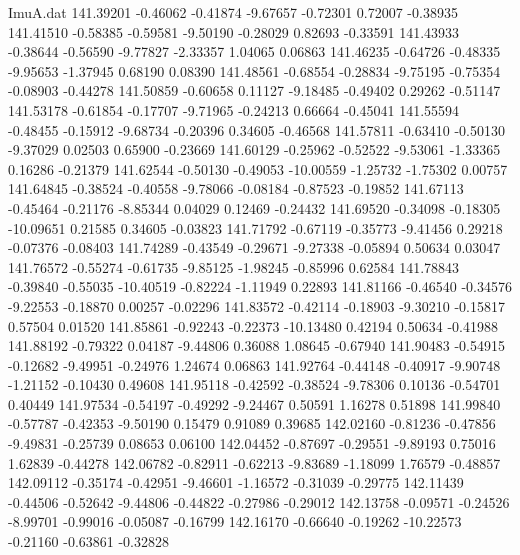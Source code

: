 \begin{filecontents}{ImuA.dat}
 141.39201   -0.46062   -0.41874   -9.67657   -0.72301    0.72007   -0.38935
 141.41510   -0.58385   -0.59581   -9.50190   -0.28029    0.82693   -0.33591
 141.43933   -0.38644   -0.56590   -9.77827   -2.33357    1.04065    0.06863
 141.46235   -0.64726   -0.48335   -9.95653   -1.37945    0.68190    0.08390
 141.48561   -0.68554   -0.28834   -9.75195   -0.75354   -0.08903   -0.44278
 141.50859   -0.60658    0.11127   -9.18485   -0.49402    0.29262   -0.51147
 141.53178   -0.61854   -0.17707   -9.71965   -0.24213    0.66664   -0.45041
 141.55594   -0.48455   -0.15912   -9.68734   -0.20396    0.34605   -0.46568
 141.57811   -0.63410   -0.50130   -9.37029    0.02503    0.65900   -0.23669
 141.60129   -0.25962   -0.52522   -9.53061   -1.33365    0.16286   -0.21379
 141.62544   -0.50130   -0.49053  -10.00559   -1.25732   -1.75302    0.00757
 141.64845   -0.38524   -0.40558   -9.78066   -0.08184   -0.87523   -0.19852
 141.67113   -0.45464   -0.21176   -8.85344    0.04029    0.12469   -0.24432
 141.69520   -0.34098   -0.18305  -10.09651    0.21585    0.34605   -0.03823
 141.71792   -0.67119   -0.35773   -9.41456    0.29218   -0.07376   -0.08403
 141.74289   -0.43549   -0.29671   -9.27338   -0.05894    0.50634    0.03047
 141.76572   -0.55274   -0.61735   -9.85125   -1.98245   -0.85996    0.62584
 141.78843   -0.39840   -0.55035  -10.40519   -0.82224   -1.11949    0.22893
 141.81166   -0.46540   -0.34576   -9.22553   -0.18870    0.00257   -0.02296
 141.83572   -0.42114   -0.18903   -9.30210   -0.15817    0.57504    0.01520
 141.85861   -0.92243   -0.22373  -10.13480    0.42194    0.50634   -0.41988
 141.88192   -0.79322    0.04187   -9.44806    0.36088    1.08645   -0.67940
 141.90483   -0.54915   -0.12682   -9.49951   -0.24976    1.24674    0.06863
 141.92764   -0.44148   -0.40917   -9.90748   -1.21152   -0.10430    0.49608
 141.95118   -0.42592   -0.38524   -9.78306    0.10136   -0.54701    0.40449
 141.97534   -0.54197   -0.49292   -9.24467    0.50591    1.16278    0.51898
 141.99840   -0.57787   -0.42353   -9.50190    0.15479    0.91089    0.39685
 142.02160   -0.81236   -0.47856   -9.49831   -0.25739    0.08653    0.06100
 142.04452   -0.87697   -0.29551   -9.89193    0.75016    1.62839   -0.44278
 142.06782   -0.82911   -0.62213   -9.83689   -1.18099    1.76579   -0.48857
 142.09112   -0.35174   -0.42951   -9.46601   -1.16572   -0.31039   -0.29775
 142.11439   -0.44506   -0.52642   -9.44806   -0.44822   -0.27986   -0.29012
 142.13758   -0.09571   -0.24526   -8.99701   -0.99016   -0.05087   -0.16799
 142.16170   -0.66640   -0.19262  -10.22573   -0.21160   -0.63861   -0.32828

\end{filecontents}
